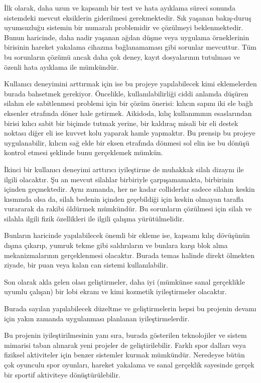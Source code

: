 \documentclass[a4paper, 12pt, titlepage]{article}
\begin{document}
İlk olarak, daha uzun ve kapsamlı bir test ve hata ayıklama süreci sonunda sistemdeki mevcut
eksiklerin giderilmesi gerekmektedir. Sık yaşanan bakış-duruş uyumsuzluğu sistemin bir numaralı
problemidir ve çözülmeyi beklenmektedir. Bunun haricinde, daha nadir yaşanan ağdan düşme veya
uygulama örneklerinin birisinin hareket yakalama cihazına bağlanamaması gibi sorunlar mevcuttur.
Tüm bu sorunların çözümü ancak daha çok deney, kayıt dosyalarının tutulması ve özenli hata ayıklama
ile mümkündür.

Kullanıcı deneyimini arttırmak için ise bu projeye yapılabilecek kimi eklemelerden burada bahsetmek
gerekiyor. Öncelikle, kullanılabilirliği ciddi anlamda düşüren silahın ele sabitlenmesi problemi
için bir çözüm önerisi: kılıcın sapını iki ele bağlı eksenler etrafında döner hale getirmek.
Aikidoda, kılıç kullanımının esaslarından birisi kılıcı sabit bir biçimde tutmak yerine, bir
kaldıraç misali bir eli destek noktası diğer eli ise kuvvet kolu yaparak hamle yapmaktır. Bu
prensip bu projeye uygulanabilir, kılıcın sağ elde bir eksen etrafında dönmesi sol elin ise bu
dönüşü kontrol etmesi şeklinde bunu gerçeklemek mümkün.

İkinci bir kullanıcı deneyimi arttırıcı iyileştirme de muhakkak silah dizaynı ile ilgili olacaktır.
Şu an mevcut silahlar birbiriyle çarpışamamakta, birbirinin içinden geçmektedir. Aynı zamanda, her
ne kadar colliderlar sadece silahın keskin kısmında olsa da, silah bedenin içinden geçebildiği için
keskin olmayan tarafla vurararak da rakibi öldürmek mümkündür. Bu sorunların çözülmesi için
silah ve silahla ilgili fizik özellikleri ile ilgili çalışma yürütülmelidir.

Bunların haricinde yapılabilecek önemli bir ekleme ise, kapsamı kılıç dövüşünün dışına çıkarıp,
yumruk tekme gibi saldırıların ve bunlara karşı blok alma mekanizmalarının gerçeklenmesi olacaktır.
Burada temas halinde direkt ölmekten ziyade, bir puan veya kalan can sistemi kullanılabilir.

Son olarak akla gelen olası geliştirmeler, daha iyi (mümkünse sanal gerçeklikle uyumlu çalışan) bir
lobi ekranı ve kimi kozmetik iyileştirmeler olacaktır.

Burada sayılan yapılabilecek düzeltme ve geliştirmelerin hepsi bu projenin devamı için yakın
zamanda uygulanması planlanan iyileştirmelerdir.

Bu projenin iyileştirilmesinin yanı sıra, burada gösterilen teknolojiler ve sistem mimarisi taban
alınarak yeni projeler de geliştirilebilir. Farklı spor dalları veya fiziksel aktiviteler için benzer
sistemler kurmak mümkündür. Neredeyse bütün çok oyunculu spor oyunları, hareket yakalama ve sanal
gerçeklik sayesinde gerçek bir sportif aktiviteye dönüştürülebilir.
\end{document}
